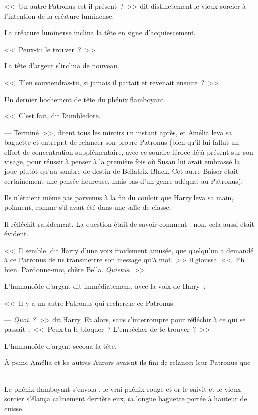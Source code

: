 <<~Un autre Patronus est-il présent~?~>> dit distinctement le vieux sorcier à l'intention de la créature lumineuse.

La créature lumineuse inclina la tête en signe d'acquiescement.

<<~Peux-tu le trouver~?~>>

La tête d'argent s'inclina de nouveau.

<<~T'en souviendras-tu, si jamais il partait et revenait ensuite~?~>>

Un dernier hochement de tête du phénix flamboyant.

<<~C'est fait, dit Dumbledore.

--- Terminé~>>, dirent tous les miroirs un instant après, et Amélia leva sa baguette et entreprit de relancer son propre Patronus (bien qu'il lui fallut un effort de concentration supplémentaire, avec ce sourire féroce déjà présent sur son visage, pour réussir à penser à la première fois où Susan lui avait embrassé la joue plutôt qu'au sombre de destin de Bellatrix Black. Cet autre Baiser était certainement une pensée heureuse, mais pas d'un genre adéquat au Patronus).

\later

Ils n'étaient même pas parvenus à la fin du couloir que Harry leva sa main, poliment, comme s'il avait été dans une salle de classe.

Il réfléchit rapidement. La question était de savoir comment - non, cela aussi était évident.

<<~Il semble, dit Harry d'une voix froidement amusée, que quelqu'un a demandé à ce Patronus de ne transmettre son message qu'à moi.~>> Il gloussa. <<~Eh bien. Pardonne-moi, chère Bella. \emph{Quietus}.~>>

L'humanoïde d'argent dit immédiatement, avec la voix de Harry~:

<<~Il y a un autre Patronus qui recherche ce Patronus.

--- \emph{Quoi~?}~>> dit Harry. Et alors, sans s'interrompre pour réfléchir à ce qui se passait~: <<~Peux-tu le bloquer~? L'empêcher de te trouver~?~>>

L'humanoïde d'argent secoua la tête.

\later

À peine Amélia et les autres Aurors avaient-ils fini de relancer leur Patronus que -

Le phénix flamboyant s'envola , le vrai phénix rouge et or le suivit et le vieux sorcier s'élança calmement derrière eux, sa longue baguette portée à hauteur de cuisse.

